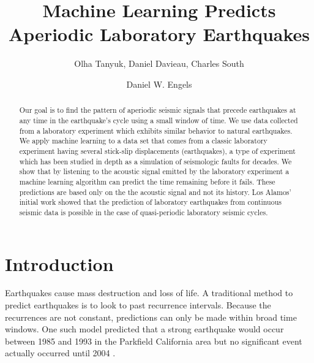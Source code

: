 \documentclass[]{llncs} %
\begin{document}

\title{Machine Learning Predicts Aperiodic Laboratory Earthquakes}
\author{Olha Tanyuk, Daniel Davieau, Charles South \and Daniel W. Engels}
\maketitle
\begin{abstract}
Our goal is to find the pattern of aperiodic seismic signals that precede earthquakes at any time in the earthquake’s cycle using a small window of time. We use data collected from a laboratory experiment which exhibits similar behavior to natural earthquakes. We apply machine learning to a data set that comes from a classic laboratory experiment having several stick-slip displacements (earthquakes), a type of experiment which has been studied in depth as a simulation of seismologic faults for decades. We show that by listening to the acoustic signal emitted by the laboratory experiment a machine learning algorithm can predict the time remaining before it fails. These predictions are based only on the the acoustic signal and not its history. Los Alamos' initial work showed that the prediction of laboratory earthquakes from continuous seismic data is possible in the case of quasi-periodic laboratory seismic cycles.  \par
	
\end{abstract}

\section{Introduction}
Earthquakes cause mass destruction and loss of life. A traditional method to predict earthquakes is to look to past recurrence intervals. Because the recurrences are not constant, predictions can only be made within broad time windows. One such model predicted that a strong earthquake would occur between 1985 and 1993 in the Parkfield California area but no significant event actually occurred until 2004 \cite{Jackson}. \par
\end{document}
